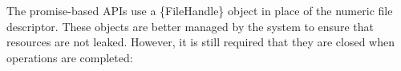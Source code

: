 \begin{Shaded}
\begin{Highlighting}[]
\OperatorTok{,}\OperatorTok{,} \OperatorTok{;}

 
  \OperatorTok{,}\KeywordTok{=\textgreater{}}\NormalTok{ \{}
    \OperatorTok{;}
\NormalTok{  \})}\OperatorTok{;}
\NormalTok{\}}

\NormalTok{(}\OperatorTok{,} \OperatorTok{,}\OperatorTok{,}\KeywordTok{=\textgreater{}}\NormalTok{ \{}
  \OperatorTok{;}
  \NormalTok{ \{}
    \OperatorTok{,}\OperatorTok{,}\KeywordTok{=\textgreater{}}\NormalTok{ \{}
        \OperatorTok{;}
        \OperatorTok{;}
\NormalTok{      \}}


      \OperatorTok{;}
\NormalTok{    \})}\OperatorTok{;}
\NormalTok{  \} }
    \OperatorTok{;}
    \OperatorTok{;}
\NormalTok{  \}}
\NormalTok{\})}\OperatorTok{;}
\end{Highlighting}
\end{Shaded}

The promise-based APIs use a \{FileHandle\} object in place of the
numeric file descriptor. These objects are better managed by the system
to ensure that resources are not leaked. However, it is still required
that they are closed when operations are completed:

